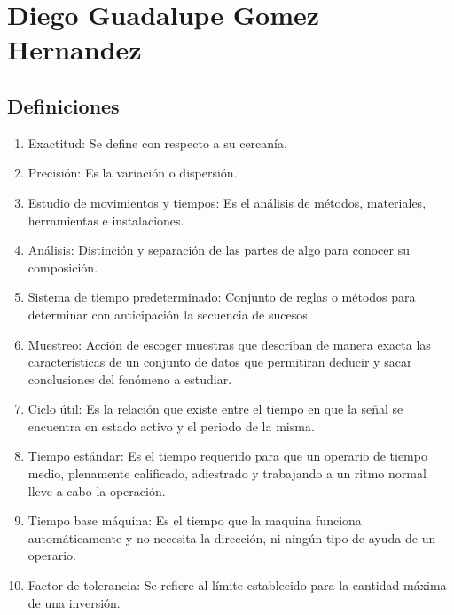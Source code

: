 \section{Diego Guadalupe Gomez Hernandez}
\subsection{Definiciones}

\begin{enumerate}
    \item Exactitud: Se define con respecto a su cercanía.
    \item Precisión: Es la variación o dispersión.
    \item Estudio de movimientos y tiempos: Es el análisis de métodos, materiales, herramientas e instalaciones.
    \item Análisis: Distinción y separación de las partes de algo para conocer su composición.
    \item Sistema de tiempo predeterminado: Conjunto de reglas o métodos para determinar con anticipación la secuencia de sucesos.
    \item Muestreo: Acción de escoger muestras que describan de manera exacta las características de un conjunto de datos que permitiran deducir y sacar conclusiones del fenómeno a estudiar.
    \item Ciclo útil: Es la relación que existe entre el tiempo en que la señal se encuentra en estado activo y el periodo de la misma.
    \item Tiempo estándar: Es el tiempo requerido para que un operario de tiempo medio, plenamente calificado, adiestrado y trabajando a un ritmo normal lleve a cabo la operación.
    \item Tiempo base máquina: Es el tiempo que la maquina funciona automáticamente y no necesita la dirección, ni ningún tipo de ayuda de un operario.
    \item Factor de tolerancia: Se refiere al límite establecido para la cantidad máxima de una inversión.
    
    
\end{enumerate}